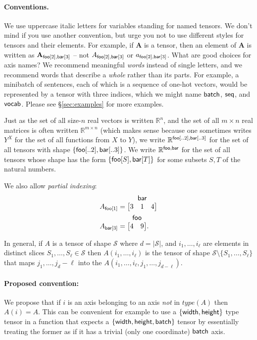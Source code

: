 \documentclass{article}
\makeatletter
\newcommand{\tuple}[1]{\{#1\}}
\newcommand{\nmatrix}[3]{\name{#1}\begin{array}[b]{@{}c@{}}\name{#2}\\\begin{bmatrix}#3\end{bmatrix}\end{array}}
\makeatother
\begin{document}
\paragraph{Conventions.}
We use uppercase italic letters for variables standing for named tensors. We don't mind if you use another convention, but urge you not to use different styles for tensors and their elements. For example, if $\mathbf{A}$ is a tensor, then an element of $\mathbf{A}$ is written as $\mathbf{A}_{\mathsf{foo}[2], \mathsf{bar}[3]}$ -- 
not $A_{\mathsf{foo}[2],\mathsf{bar}[3]}$ or $a_{\mathsf{foo}[2],\mathsf{bar}[3]}$.
What are good choices for axis names? We recommend meaningful \emph{words} instead of single letters, and we recommend words that describe a \emph{whole} rather than its parts. For example, a minibatch of sentences, each of which is a sequence of one-hot vectors, would be represented by a tensor with three indices, which we might name $\mathsf{batch}$, $\mathsf{seq}$, and $\mathsf{vocab}$. Please see \S\ref{sec:examples} for more examples.


Just as the set of all size-$n$ real vectors is written $\mathbb{R}^n$, and the set of all $m\times n$ real matrices is often written $\mathbb{R}^{m \times n}$ (which makes sense because one sometimes writes $Y^X$ for the set of all functions from $X$ to $Y$), we write $\mathbb{R}^{\mathsf{foo}[..2], \mathsf{bar}[..3]}$ for the set of all tensors with shape $\tuple{\nset{foo}{..2}, \nset{bar}{..3}}$.
We write $\mathbb{R}^{\mathsf{foo},\mathsf{bar}}$ for the set of all tensors whose shape has the form $\{ \mathsf{foo}[S], \mathsf{bar}[T] \}$ for some subsets $S,T$ of the natural numbers.


We also allow \emph{partial indexing}:
\begin{align*}
A_{\nidx{foo}{1}} &= \nmatrix{}{bar}{
  3 & 1 & 4
}
\\
A_{\nidx{bar}{3}} &= \nmatrix{}{foo}{
  4 & 9
}.
\end{align*}

In general, if $A$ is a tensor of shape $\mathcal{S}$ where $d=|\mathcal{S}|$, and $i_1,\ldots,i_\ell$ are elements in distinct slices $S_1,\ldots,S_\ell \in \mathcal{S}$ then $A(i_1,\ldots,i_\ell)$ is the tensor of shape $\mathcal{S} \setminus \{ S_1,\ldots, S_\ell \}$ that maps $j_1,\ldots,j_d-{\ell}$ into the $A(i_1,\ldots,i_\ell,j_1,\ldots,j_{d-\ell})$.



\paragraph{Proposed convention:} We propose that if $i$ is an axis belonging to an axis  \emph{not} in  $type(A)$ then $A(i)=A$.  This can be convenient for example to use a $\{ \mathsf{width} ,\mathsf{height} \}$ type tensor in a function that expects a $\{ \mathsf{width} , \mathsf{height} , \mathsf{batch} \}$ tensor by essentially treating the former as if it has a trivial (only one coordinate) $\mathsf{batch}$ axis.
\end{document}
